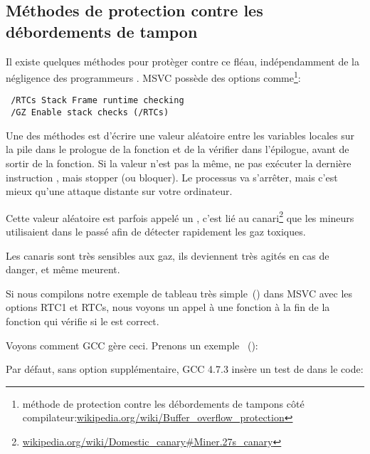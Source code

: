 \subsection{Méthodes de protection contre les débordements de tampon}
\label{subsec:BO_protection}

Il existe quelques méthodes pour protèger contre ce fléau, indépendamment de la négligence
des programmeurs \CCpp.
MSVC possède des options comme\footnote{méthode de protection contre les débordements
de tampons côté compilateur:\href{http://go.yurichev.com/17133}{wikipedia.org/wiki/Buffer\_overflow\_protection}}:

\begin{lstlisting}
 /RTCs Stack Frame runtime checking
 /GZ Enable stack checks (/RTCs)
\end{lstlisting}


Une des méthodes est d'écrire une valeur aléatoire entre les variables locales sur
la pile dans le prologue de la fonction et de la vérifier dans l'épilogue, avant de
sortir de la fonction.
Si la valeur n'est pas la même, ne pas exécuter la dernière instruction \RET, mais
stopper (ou bloquer).
Le processus va s'arrêter, mais c'est mieux qu'une attaque distante sur votre ordinateur.
    
\newcommand{\CANARYURL}{\href{http://go.yurichev.com/17134}{wikipedia.org/wiki/Domestic\_canary\#Miner.27s\_canary}}


Cette valeur aléatoire est parfois appelé un , c'est lié au canari\footnote{\CANARYURL}
que les mineurs utilisaient dans le passé afin de détecter rapidement les gaz toxiques.

Les canaris sont très sensibles aux gaz, ils deviennent très agités en cas de danger,
et même meurent.

Si nous compilons notre exemple de tableau très simple~() dans
\ac{MSVC} avec les options RTC1 et RTCs, nous voyons un appel à 
une fonction à la fin de la fonction qui vérifie si le  est correct.

Voyons comment GCC gère ceci.
Prenons un exemple ~():



Par défaut, sans option supplémentaire, GCC 4.7.3 insère un test de   dans
le code:


